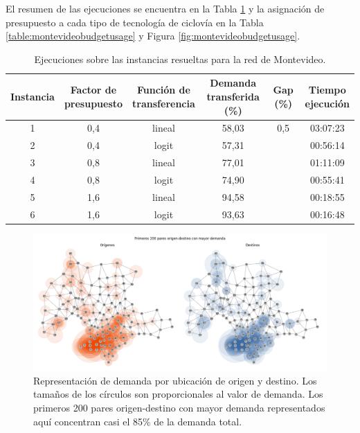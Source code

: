 \documentclass{article}
\begin{document}
  El resumen de las ejecuciones se encuentra en la Tabla \ref{table:montevideoexecutions} y la asignación de presupuesto a cada tipo de tecnología de ciclovía en la Tabla \ref{table:montevideobudgetusage} y Figura \ref{fig:montevideobudgetusage}.

  \begin{table}[h!]
    \centering
    \begin{tabular}{cccccc}
      \toprule
        Instancia & \shortstack{Factor de \\ presupuesto} & \shortstack{Función de \\ transferencia} & \shortstack{Demanda \\ transferida (\%)} & Gap (\%) & \shortstack{Tiempo \\ ejecución} \\
      \midrule
        1 & 0,4 & lineal & 58,03 & 0,5 & 03:07:23 \\
        2 & 0,4 & logit & 57,31 &  & 00:56:14 \\
        3 & 0,8 & lineal & 77,01 &  & 01:11:09 \\
        4 & 0,8 & logit & 74,90 &  & 00:55:41 \\
        5 & 1,6 & lineal & 94,58 &  & 00:18:55 \\
        6 & 1,6 & logit & 93,63 &  & 00:16:48 \\
      \bottomrule
    \end{tabular}
    \caption{Ejecuciones sobre las instancias resueltas para la red de Montevideo.}\label{table:montevideoexecutions}
  \end{table}

  \begin{figure}[h!]
    \centering
    \includegraphics[width=12cm]{../resources/montevideo_demands.png}
      \caption{Representación de demanda por ubicación de origen y destino. Los tamaños de los círculos son proporcionales al valor de demanda. Los primeros 200 pares origen-destino con mayor demanda representados aquí concentran casi el 85\% de la demanda total.}
    \label{fig:montevideodemanddist}
  \end{figure}
\end{document}
